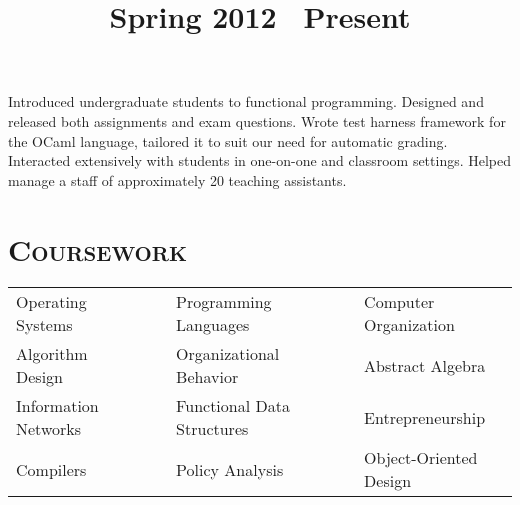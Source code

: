 \begin{resume}
\title{Spring 2012 \textendash\ Present}
\location{}
\begin{position}
Introduced undergraduate students to functional programming.
Designed and released both assignments and exam questions. 
Wrote test harness framework for the OCaml language, tailored it to suit our need for automatic grading.
Interacted extensively with students in one-on-one and classroom settings.
Helped manage a staff of approximately 20 teaching assistants.
\end{position}




\vfill

\renewcommand*\arraystretch{1.2}
\section{\textsc{Coursework}}
 \begin{tabular}{lllll}
 Operating Systems      & \ \ & Programming Languages           & \ \ & Computer Organization \\
 Algorithm Design      & \ \ & Organizational Behavior       & \ \ & Abstract Algebra    \\
 Information Networks     & \ \ & Functional Data Structures       & \ \ &  Entrepreneurship       \\
 Compilers      & \ \ &  Policy Analysis   & \ \ & Object-Oriented Design   \\
 \end{tabular}\\


\end{resume}
